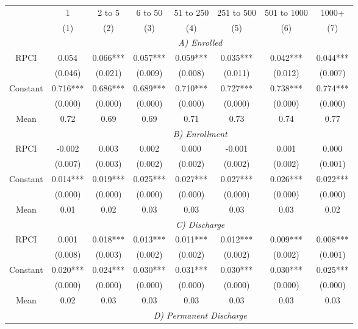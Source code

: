 \begin{tabular}{cccccccc}
\toprule
\toprule
      & 1     & 2 to 5 & 6 to 50 & 51 to 250 & 251 to 500 & 501 to 1000 & 1000+ \\
      & (1)   & (2)   & (3)   & (4)   & (5)   & (6)   & (7) \\
\cmidrule{2-8}      & \multicolumn{7}{c}{\textit{A) Enrolled}} \\
\midrule
RPCI  & 0.054 & 0.066*** & 0.057*** & 0.059*** & 0.035*** & 0.042*** & 0.044*** \\
      & (0.046) & (0.021) & (0.009) & (0.008) & (0.011) & (0.012) & (0.007) \\
Constant & 0.716*** & 0.686*** & 0.689*** & 0.710*** & 0.727*** & 0.738*** & 0.774*** \\
      & (0.000) & (0.000) & (0.000) & (0.000) & (0.000) & (0.000) & (0.000) \\
Mean  & 0.72  & 0.69  & 0.69  & 0.71  & 0.73  & 0.74  & 0.77 \\
\cmidrule{2-8}      & \multicolumn{7}{c}{\textit{B) Enrollment}} \\
\midrule
RPCI  & -0.002 & 0.003 & 0.002 & 0.000 & -0.001 & 0.001 & 0.000 \\
      & (0.007) & (0.003) & (0.002) & (0.002) & (0.002) & (0.002) & (0.001) \\
Constant & 0.014*** & 0.019*** & 0.025*** & 0.027*** & 0.027*** & 0.026*** & 0.022*** \\
      & (0.000) & (0.000) & (0.000) & (0.000) & (0.000) & (0.000) & (0.000) \\
Mean  & 0.01  & 0.02  & 0.03  & 0.03  & 0.03  & 0.03  & 0.02 \\
\cmidrule{2-8}      & \multicolumn{7}{c}{\textit{C) Discharge}} \\
\midrule
RPCI  & 0.001 & 0.018*** & 0.013*** & 0.011*** & 0.012*** & 0.009*** & 0.008*** \\
      & (0.008) & (0.003) & (0.002) & (0.002) & (0.002) & (0.002) & (0.001) \\
Constant & 0.020*** & 0.024*** & 0.030*** & 0.031*** & 0.030*** & 0.030*** & 0.025*** \\
      & (0.000) & (0.000) & (0.000) & (0.000) & (0.000) & (0.000) & (0.000) \\
Mean  & 0.02  & 0.03  & 0.03  & 0.03  & 0.03  & 0.03  & 0.03 \\
\cmidrule{2-8}      & \multicolumn{7}{c}{\textit{D) Permanent Discharge}} \\

\end{tabular}
